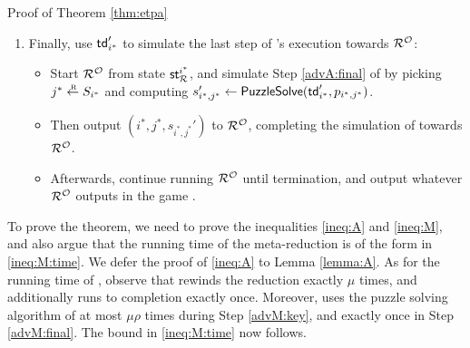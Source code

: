 \begin{namedproof}{Proof of Theorem \ref{thm:etpa}}
\begin{enumerate}[itemsep=0.1cm]
\begin{itemize}[label={\textbullet},itemsep=0.1cm]
                  for each \(j \in [\rho] \setminus S_{i^{*}}\).
            \item If so, denote this trapdoor by \(\td_{i^{*}}'\) and exit the loop.
                  If not: continue to the next \(\ell\).
            \item If no trapdoor \(\td_{i^{*}}'\) satisfying the above
                  was found during the entire loop: abort.
          \end{itemize}
    \item\label{advM:final} Finally, use \(\td_{i^{*}}'\) to simulate the
          last step of \advA's execution towards \(\redR^{\oracle}\):
          \begin{itemize}[label={\textbullet},itemsep=0.1cm]
            \item Start \(\redR^{\oracle}\) from state \(\state_{\redR}^{i^{*}}\),
                  and simulate Step \ref{advA:final} of \advA by picking \(j^{*} \sampleR S_{i^{*}}\)
                  and computing \(s_{i^{*},j^{*}}' \leftarrow \mathsf{PuzzleSolve}(\mathsf{td}_{i^{*}}',p_{i^{*},j^{*}})\).
            \item Then output \((i^{*},j^{*}, s_{i^{*},j^{*}}')\) to \(\redR^{\oracle}\),
                  completing the simulation of \advA towards \(\redR^{\oracle}\).
            \item Afterwards, continue running \(\redR^{\oracle}\)
                  until termination, and output whatever \(\redR^{\oracle}\)
                  outputs in the game \SICA.
          \end{itemize}
  \end{enumerate}

  To prove the theorem, we need to prove the inequalities \eqref{ineq:A} and \eqref{ineq:M},
  and also argue that the running time of the meta-reduction \redM is of the form in \eqref{ineq:M:time}.
  We defer the proof of \eqref{ineq:A} to Lemma \ref{lemma:A}.
  As for the running time of \redM,
  observe that \redM rewinds the reduction \redR exactly \(\mu\) times,
  and additionally runs \redR to completion exactly once.
  Moreover, \redM uses the puzzle solving algorithm \PuzzleSolve of \TP
  at most \(\mu \rho\) times during Step \ref{advM:key},
  and exactly once in Step \ref{advM:final}.
  The bound in \eqref{ineq:M:time} now follows.


\end{namedproof}
